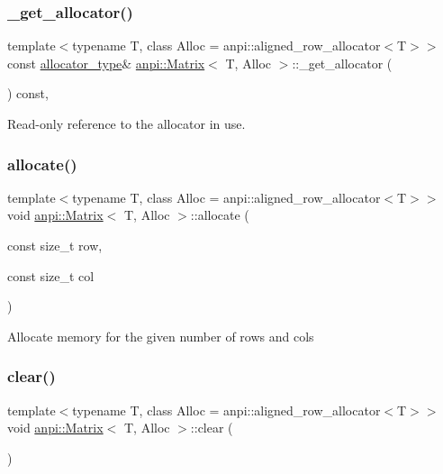 \subsubsection{\texorpdfstring{\+\_\+get\+\_\+allocator()}{\_get\_allocator()}\hspace{0.1cm}{\footnotesize\ttfamily [2/2]}}
{\footnotesize\ttfamily template$<$typename T, class Alloc = anpi\+::aligned\+\_\+row\+\_\+allocator$<$\+T$>$$>$ \\
const \hyperlink{classanpi_1_1Matrix_a3574b7528e3ddfb2f7cdf446be8286c1}{allocator\+\_\+type}\& \hyperlink{classanpi_1_1Matrix}{anpi\+::\+Matrix}$<$ T, Alloc $>$\+::\+\_\+get\+\_\+allocator (\begin{DoxyParamCaption}{ }\end{DoxyParamCaption}) const\hspace{0.3cm}{\ttfamily [private]}, {\ttfamily [noexcept]}}



Read-\/only reference to the allocator in use. 

\mbox{\label{classanpi_1_1Matrix_ad052d3579194efb15c5d98b6edc43893}} 
\subsubsection{\texorpdfstring{allocate()}{allocate()}}
{\footnotesize\ttfamily template$<$typename T, class Alloc = anpi\+::aligned\+\_\+row\+\_\+allocator$<$\+T$>$$>$ \\
void \hyperlink{classanpi_1_1Matrix}{anpi\+::\+Matrix}$<$ T, Alloc $>$\+::allocate (\begin{DoxyParamCaption}\item[{const size\+\_\+t}]{row,  }\item[{const size\+\_\+t}]{col }\end{DoxyParamCaption})}

Allocate memory for the given number of rows and cols \mbox{\label{classanpi_1_1Matrix_afa6d4775f44642587dc9f7c2cfb9e1d9}} 
\subsubsection{\texorpdfstring{clear()}{clear()}}
{\footnotesize\ttfamily template$<$typename T, class Alloc = anpi\+::aligned\+\_\+row\+\_\+allocator$<$\+T$>$$>$ \\
void \hyperlink{classanpi_1_1Matrix}{anpi\+::\+Matrix}$<$ T, Alloc $>$\+::clear (\begin{DoxyParamCaption}{ }\end{DoxyParamCaption})}

